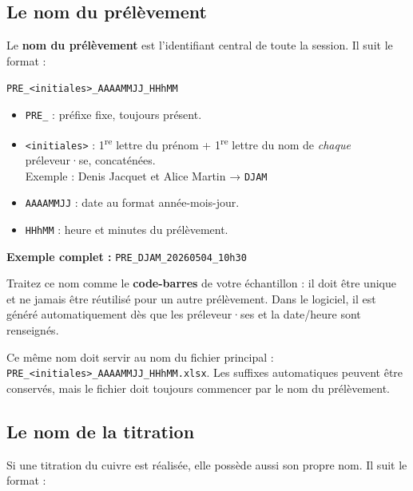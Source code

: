 \documentclass[12pt, a4paper]{article}
\begin{document}
\subsection{Le nom du prélèvement}

Le \textbf{nom du prélèvement} est l'identifiant central de toute
la session. Il suit le format :

\begin{center}
  \large\texttt{PRE\_<initiales>\_AAAAMMJJ\_HHhMM}
\end{center}

\begin{itemize}
  \item \texttt{PRE\_} : préfixe fixe, toujours présent.
  \item \texttt{<initiales>} : 1\textsuperscript{re} lettre du prénom + 1\textsuperscript{re}
        lettre du nom de \emph{chaque} préleveur·se, concaténées.\\
        Exemple : Denis Jacquet et Alice Martin → \texttt{DJAM}
  \item \texttt{AAAAMMJJ} : date au format année-mois-jour.
  \item \texttt{HHhMM} : heure et minutes du prélèvement.
\end{itemize}

\begin{center}
  \large\textbf{Exemple complet :} \texttt{PRE\_DJAM\_20260504\_10h30}
\end{center}

\begin{conseil}
  Traitez ce nom comme le \textbf{code-barres} de votre échantillon :
  il doit être unique et ne jamais être réutilisé pour un autre prélèvement.
  Dans le logiciel, il est généré automatiquement dès que les
  préleveur·ses et la date/heure sont renseignés.
\end{conseil}

\begin{important}
  Ce même nom doit servir au nom du fichier principal :
  \texttt{PRE\_<initiales>\_AAAAMMJJ\_HHhMM.xlsx}. Les suffixes
  automatiques peuvent être conservés, mais le fichier doit toujours
  commencer par le nom du prélèvement.
\end{important}

\subsection{Le nom de la titration}

Si une titration du cuivre est réalisée, elle possède aussi son
propre nom. Il suit le format :
\end{document}
